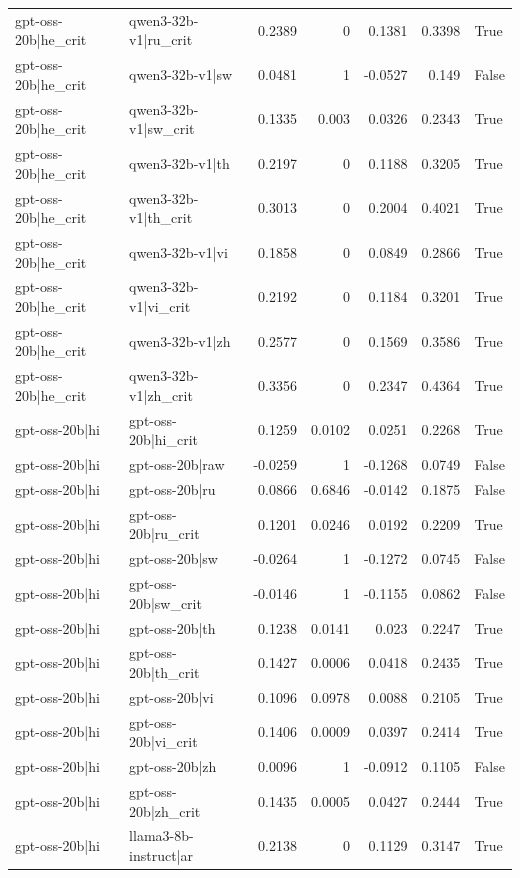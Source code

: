 \begin{table}
\begin{tabular}{l l r r r r l}
gpt-oss-20b|he_crit & qwen3-32b-v1|ru_crit & 0.2389 & 0 & 0.1381 & 0.3398 & True \\
gpt-oss-20b|he_crit & qwen3-32b-v1|sw & 0.0481 & 1 & -0.0527 & 0.149 & False \\
gpt-oss-20b|he_crit & qwen3-32b-v1|sw_crit & 0.1335 & 0.003 & 0.0326 & 0.2343 & True \\
gpt-oss-20b|he_crit & qwen3-32b-v1|th & 0.2197 & 0 & 0.1188 & 0.3205 & True \\
gpt-oss-20b|he_crit & qwen3-32b-v1|th_crit & 0.3013 & 0 & 0.2004 & 0.4021 & True \\
gpt-oss-20b|he_crit & qwen3-32b-v1|vi & 0.1858 & 0 & 0.0849 & 0.2866 & True \\
gpt-oss-20b|he_crit & qwen3-32b-v1|vi_crit & 0.2192 & 0 & 0.1184 & 0.3201 & True \\
gpt-oss-20b|he_crit & qwen3-32b-v1|zh & 0.2577 & 0 & 0.1569 & 0.3586 & True \\
gpt-oss-20b|he_crit & qwen3-32b-v1|zh_crit & 0.3356 & 0 & 0.2347 & 0.4364 & True \\
gpt-oss-20b|hi & gpt-oss-20b|hi_crit & 0.1259 & 0.0102 & 0.0251 & 0.2268 & True \\
gpt-oss-20b|hi & gpt-oss-20b|raw & -0.0259 & 1 & -0.1268 & 0.0749 & False \\
gpt-oss-20b|hi & gpt-oss-20b|ru & 0.0866 & 0.6846 & -0.0142 & 0.1875 & False \\
gpt-oss-20b|hi & gpt-oss-20b|ru_crit & 0.1201 & 0.0246 & 0.0192 & 0.2209 & True \\
gpt-oss-20b|hi & gpt-oss-20b|sw & -0.0264 & 1 & -0.1272 & 0.0745 & False \\
gpt-oss-20b|hi & gpt-oss-20b|sw_crit & -0.0146 & 1 & -0.1155 & 0.0862 & False \\
gpt-oss-20b|hi & gpt-oss-20b|th & 0.1238 & 0.0141 & 0.023 & 0.2247 & True \\
gpt-oss-20b|hi & gpt-oss-20b|th_crit & 0.1427 & 0.0006 & 0.0418 & 0.2435 & True \\
gpt-oss-20b|hi & gpt-oss-20b|vi & 0.1096 & 0.0978 & 0.0088 & 0.2105 & True \\
gpt-oss-20b|hi & gpt-oss-20b|vi_crit & 0.1406 & 0.0009 & 0.0397 & 0.2414 & True \\
gpt-oss-20b|hi & gpt-oss-20b|zh & 0.0096 & 1 & -0.0912 & 0.1105 & False \\
gpt-oss-20b|hi & gpt-oss-20b|zh_crit & 0.1435 & 0.0005 & 0.0427 & 0.2444 & True \\
gpt-oss-20b|hi & llama3-8b-instruct|ar & 0.2138 & 0 & 0.1129 & 0.3147 & True \\

\end{tabular}
\end{table}
